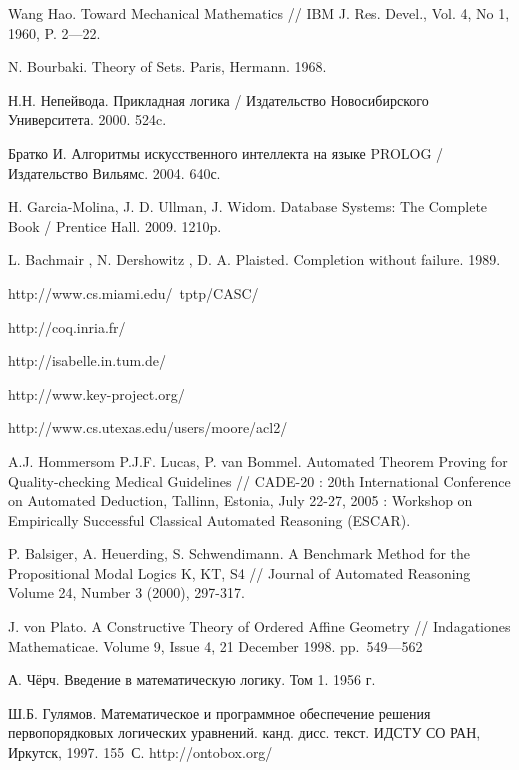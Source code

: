 \begin{thebibliography}{99}
 Wang Hao. Toward Mechanical Mathematics // IBM J. Res. Devel., Vol. 4, No 1, 1960, P. 2---22.

 N. Bourbaki. Theory of Sets. Paris, Hermann. 1968.

 Н.Н. Непейвода. Прикладная логика / Издательство Новосибирского Университета. 2000. 524c.

 Братко И. Алгоритмы искусственного интеллекта на языке PROLOG / Издательство Вильямс. 2004. 640с.

 H. Garcia-Molina, J. D. Ullman, J. Widom. Database Systems: The Complete Book / Prentice Hall. 2009. 1210p.

  L. Bachmair , N. Dershowitz , D. A. Plaisted. Completion without failure. 1989.

 http://www.cs.miami.edu/~tptp/CASC/

 http://coq.inria.fr/

 http://isabelle.in.tum.de/


 http://www.key-project.org/

 http://www.cs.utexas.edu/users/moore/acl2/



 A.J. Hommersom P.J.F. Lucas, P. van Bommel. Automated Theorem Proving for Quality-checking Medical Guidelines // CADE-20 : 20th International Conference on Automated Deduction, Tallinn, Estonia, July 22-27, 2005 : Workshop on Empirically Successful Classical Automated Reasoning (ESCAR).

 P. Balsiger, A. Heuerding, S. Schwendimann. A Benchmark Method for the Propositional Modal Logics K, KT, S4 // Journal of Automated Reasoning Volume 24, Number 3 (2000), 297-317.

 J. von Plato. A Constructive Theory of Ordered Affine Geometry // Indagationes Mathematicae. Volume 9, Issue 4, 21 December 1998. pp.~549---562

 А. Чёрч. Введение в математическую логику. Том 1. 1956 г.

 Ш.Б. Гулямов. Математическое и программное обеспечение решения первопорядковых логических уравнений. канд. дисс. текст. ИДСТУ СО РАН, Иркутск, 1997. 155~С.
 http://ontobox.org/

\end{thebibliography}



